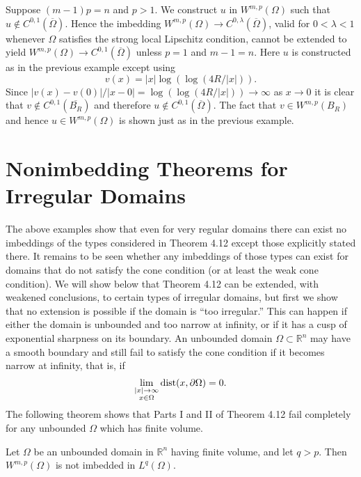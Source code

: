 \begin{example}
  Suppose $(m-1) p=n$ and $p>1$. We construct $u$ in $W^{m,p}(\Omega)$ such that $u \notin C^{0,1}(\overline{\Omega})$. Hence the imbedding $W^{m,p}(\Omega) \rightarrow C^{0, \lambda}(\overline{\Omega})$, valid for $0<\lambda<1$ whenever $\Omega$ satisfies the strong local Lipschitz condition,
  cannot be extended to yield $W^{m,p}(\Omega) \rightarrow C^{0,1}(\overline{\Omega})$ unless $p=1$ and $m-1=n$. Here $u$ is constructed as in the previous example except using
  \[
  v(x)=|x| \log (\log (4 R /|x|)) .
  \]
  Since $|v(x)-v(0)| /|x-0|=\log (\log (4 R /|x|)) \rightarrow \infty$ as $x \rightarrow 0$ it is clear that $v \notin C^{0,1}\left(\overline{B_R}\right)$ and therefore $u \notin C^{0,1}(\overline{\Omega})$. The fact that $v \in W^{m,p}\left(B_R\right)$ and hence $u \in W^{m,p}(\Omega)$ is shown just as in the previous example.
\end{example}


\section{Nonimbedding Theorems for Irregular Domains}

\begin{para}
  The above examples show that even for very regular domains there can exist no imbeddings of the types considered in Theorem 4.12 except those explicitly stated there. It remains to be seen whether any imbeddings of those types can exist for domains that do not satisfy the cone condition (or at least the weak cone condition). We will show below that Theorem 4.12 can be extended, with weakened conclusions, to certain types of irregular domains, but first we show that no extension is possible if the domain is ``too irregular.'' This can happen if either the domain is unbounded and too narrow at infinity, or if it has a cusp of exponential sharpness on its boundary.
  An unbounded domain $\Omega \subset \mathbb{R}^n$ may have a smooth boundary and still fail to satisfy the cone condition if it becomes narrow at infinity, that is, if
  \[
  \lim _{\substack{|x| \rightarrow \infty \\ x \in \Omega}} \operatorname{dist}(x, \partial \Omega)=0 .
  \]
  The following theorem shows that Parts I and II of Theorem 4.12 fail completely for any unbounded $\Omega$ which has finite volume.
\end{para}


\begin{theorem}
  Let $\Omega$ be an unbounded domain in $\mathbb{R}^n$ having finite volume, and let $q>p$. Then $W^{m,p}(\Omega)$ is not imbedded in $L^q(\Omega)$.
\end{theorem}

